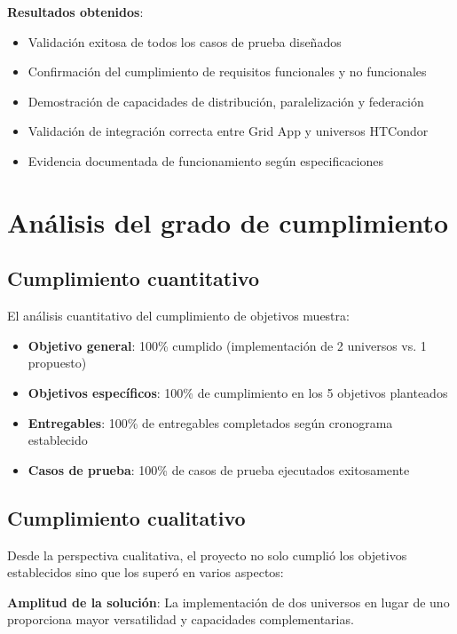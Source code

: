 \textbf{Resultados obtenidos}:
\begin{itemize}
    \item Validación exitosa de todos los casos de prueba diseñados
    \item Confirmación del cumplimiento de requisitos funcionales y no funcionales
    \item Demostración de capacidades de distribución, paralelización y federación
    \item Validación de integración correcta entre Grid App y universos HTCondor
    \item Evidencia documentada de funcionamiento según especificaciones
\end{itemize}

\section{Análisis del grado de cumplimiento}
\noindent

\subsection{Cumplimiento cuantitativo}
\noindent

El análisis cuantitativo del cumplimiento de objetivos muestra:

\begin{itemize}
    \item \textbf{Objetivo general}: 100\% cumplido (implementación de 2 universos vs. 1 propuesto)
    \item \textbf{Objetivos específicos}: 100\% de cumplimiento en los 5 objetivos planteados
    \item \textbf{Entregables}: 100\% de entregables completados según cronograma establecido
    \item \textbf{Casos de prueba}: 100\% de casos de prueba ejecutados exitosamente
\end{itemize}

\subsection{Cumplimiento cualitativo}
\noindent

Desde la perspectiva cualitativa, el proyecto no solo cumplió los objetivos establecidos sino que los superó en varios aspectos:

\textbf{Amplitud de la solución}: La implementación de dos universos en lugar de uno proporciona mayor versatilidad y capacidades complementarias.

